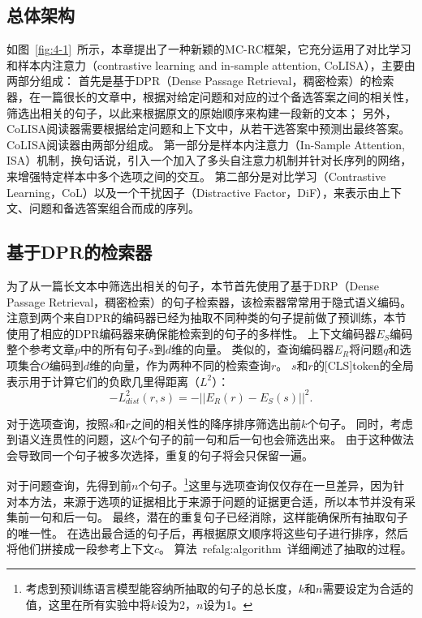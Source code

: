 \subsection{总体架构}

如图~\ref{fig:4-1}~所示，本章提出了一种新颖的MC-RC框架，它充分运用了对比学习和样本内注意力（contrastive learning and in-sample attention, CoLISA），主要由两部分组成：
首先是基于DPR（Dense Passage Retrieval，稠密检索）的检索器，在一篇很长的文章中，根据对给定问题和对应的过个备选答案之间的相关性，筛选出相关的句子，以此来根据原文的原始顺序来构建一段新的文本；
另外，CoLISA阅读器需要根据给定问题和上下文中，从若干选答案中预测出最终答案。
CoLISA阅读器由两部分组成。
第一部分是样本内注意力（In-Sample Attention, ISA）机制，换句话说，引入一个加入了多头自注意力机制并针对长序列的网络，来增强特定样本中多个选项之间的交互。
第二部分是对比学习（Contrastive Learning，CoL）以及一个干扰因子（Distractive Factor，DiF），来表示由上下文、问题和备选答案组合而成的序列。

\subsection{基于DPR的检索器}
为了从一篇长文本中筛选出相关的句子，本节首先使用了基于DRP（Dense Passage Retrieval，稠密检索）的句子检索器，该检索器常常用于隐式语义编码\cite{karpukhin2020dense}。
注意到两个来自DPR的编码器已经为抽取不同种类的句子提前做了预训练，本节使用了相应的DPR编码器来确保能检索到的句子的多样性。
上下文编码器$E_S$编码整个参考文章$p$中的所有句子$s$到$d$维的向量。
类似的，查询编码器$E_R$将问题$q$和选项集合$O$编码到$d$维的向量，作为两种不同的检索查询$r$。
$s$和$r$的[CLS]token的全局表示用于计算它们的负欧几里得距离（$L^2$）：
\begin{equation}
    -L^2_{dist}(r,s)=-||E_R(r)-E_S(s)||^2.
\end{equation}

对于选项查询，按照$s$和$r$之间的相关性的降序排序筛选出前$k$个句子。
同时，考虑到语义连贯性的问题，这$k$个句子的前一句和后一句也会筛选出来。
由于这种做法会导致同一个句子被多次选择，重复的句子将会只保留一遍。

对于问题查询，先得到前$n$个句子。\footnote{考虑到预训练语言模型能容纳所抽取的句子的总长度，$k$和$n$需要设定为合适的值，这里在所有实验中将$k$设为2，$n$设为1。}这里与选项查询仅仅存在一旦差异，因为针对本方法，来源于选项的证据相比于来源于问题的证据更合适，所以本节并没有采集前一句和后一句。
最终，潜在的重复句子已经消除，这样能确保所有抽取句子的唯一性。
在选出最合适的句子后，再根据原文顺序将这些句子进行排序，然后将他们拼接成一段参考上下文$c$。
算法~ref{alg:algorithm}~详细阐述了抽取的过程。

